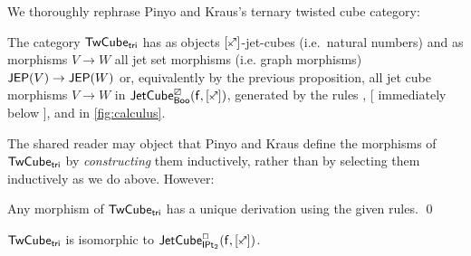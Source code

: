 \documentclass[a4paper]{memoir}
\begin{document}
We thoroughly rephrase Pinyo and Kraus's ternary twisted cube category:
\begin{definition} \cite[def.\ 34]{pinyo-twisted} \label{def:twisted-tri}
	The category ${\mathsf{TwCube}}_{\mathsf{tri}}$ has as objects $[\ypolar]$-jet-cubes (i.e.\ natural numbers) and as morphisms $V \to W$ all jet set morphisms (i.e. graph morphisms) $\mathsf{JEP}(V) \to \mathsf{JEP}(W)$ or, equivalently by the previous proposition, all jet cube morphisms $V \to W$ in $\jetcubefwd \cartes \booleanalg {[\ypolar]}$,	
	 generated by the rules , [ immediately below ],  and  in \cref{fig:calculus}.
\end{definition}
The shared reader may object that Pinyo and Kraus define the morphisms of ${\mathsf{TwCube}}_{\mathsf{tri}}$ by \emph{constructing} them inductively, rather than by selecting them inductively as we do above. However:
\begin{corollary} \label{thm:twisted-tri-inductive}
	Any morphism of ${\mathsf{TwCube}}_{\mathsf{tri}}$ has a unique derivation using the given rules. \qed
\end{corollary}
\begin{proposition}
	${\mathsf{TwCube}}_{\mathsf{tri}}$ is isomorphic to $\jetcubefwd \affine \bipointedsym {[\ypolar]}$.
\end{proposition}
\end{document}
